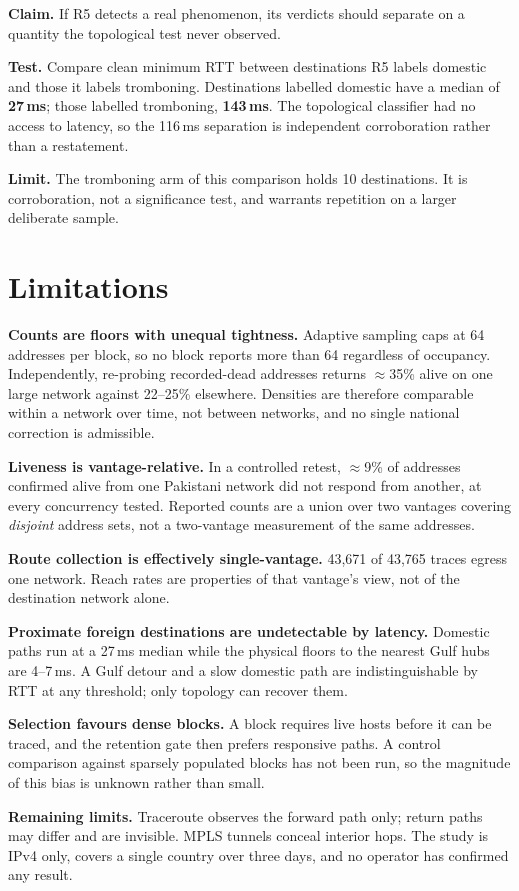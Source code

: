 \textbf{Claim.} If R5 detects a real phenomenon, its verdicts should separate on a
quantity the topological test never observed.

\textbf{Test.} Compare clean minimum RTT between destinations R5 labels domestic and those
it labels tromboning. Destinations labelled domestic have a median of \textbf{27\,ms};
those labelled tromboning, \textbf{143\,ms}. The topological classifier had no access to
latency, so the 116\,ms separation is independent corroboration rather than a restatement.

\textbf{Limit.} The tromboning arm of this comparison holds 10 destinations. It is
corroboration, not a significance test, and warrants repetition on a larger deliberate
sample.

\section{Limitations}
\label{sec:limits}

\textbf{Counts are floors with unequal tightness.} Adaptive sampling caps at 64 addresses
per block, so no block reports more than 64 regardless of occupancy. Independently,
re-probing recorded-dead addresses returns $\approx$35\% alive on one large network
against 22--25\% elsewhere. Densities are therefore comparable within a network over time,
not between networks, and no single national correction is admissible.

\textbf{Liveness is vantage-relative.} In a controlled retest, $\approx$9\% of addresses
confirmed alive from one Pakistani network did not respond from another, at every
concurrency tested. Reported counts are a union over two vantages covering
\emph{disjoint} address sets, not a two-vantage measurement of the same addresses.

\textbf{Route collection is effectively single-vantage.} 43{,}671 of 43{,}765 traces
egress one network. Reach rates are properties of that vantage's view, not of the
destination network alone.

\textbf{Proximate foreign destinations are undetectable by latency.} Domestic paths run at
a 27\,ms median while the physical floors to the nearest Gulf hubs are 4--7\,ms. A Gulf
detour and a slow domestic path are indistinguishable by RTT at any threshold; only
topology can recover them.

\textbf{Selection favours dense blocks.} A block requires live hosts before it can be
traced, and the retention gate then prefers responsive paths. A control comparison against
sparsely populated blocks has not been run, so the magnitude of this bias is unknown
rather than small.

\textbf{Remaining limits.} Traceroute observes the forward path only; return paths may
differ and are invisible. MPLS tunnels conceal interior hops. The study is IPv4 only,
covers a single country over three days, and no operator has confirmed any result.
